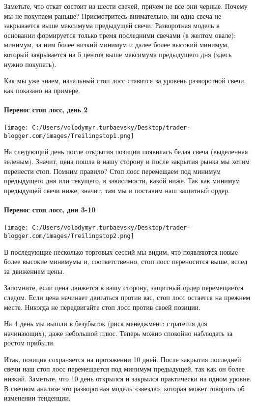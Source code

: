 \documentclass[a5paper]{article}
\begin{document}
Заметьте, что откат состоит из шести свечей, причем не все они черные. Почему мы не покупаем раньше? Присмотритесь внимательно, ни одна свеча не закрывается выше максимума предыдущей свечи. Разворотная модель в основании формируется только тремя последними свечами (в желтом овале): минимум, за ним более низкий минимум и далее более высокий минимум, который закрывается на 5 центов выше максимума предыдущего дня (здесь нужно покупать).

Как мы уже знаем, начальный стоп лосс ставится за уровень разворотной
свечи, как показано на примере.

\paragraph{Перенос стоп лосс, день 2}

\texttt{[image: C:/Users/volodymyr.turbaevsky/Desktop/trader-blogger.com/images/Treilingstop1.png]}

На следующий день после открытия позиции появилась белая свеча
(выделенная зеленым). Значит, цена пошла в нашу сторону и после
закрытия рынка мы хотим перенести стоп. Помним правило? Стоп лосс
перемещаем под минимум предыдущего дня или текущего, в зависимости,
какой ниже. Так как минимум предыдущей свечи ниже, значит, там мы и
поставим наш защитный ордер.

\paragraph{Перенос стоп лосс, дни 3-10}

\texttt{[image: C:/Users/volodymyr.turbaevsky/Desktop/trader-blogger.com/images/Treilingstop2.png]}

В последующие несколько торговых сессий мы видим, что появляются новые более высокие минимумы и, соответственно, стоп лосс переносится выше, вслед за движением цены.

Запомните, если цена движется в вашу сторону, защитный ордер перемещается следом. Если цена начинает двигаться против вас, стоп лосс остается на прежнем месте. Никогда не передвигайте стоп лосс против своей позиции.

На 4 день мы вышли в безубыток (риск менеджмент: стратегия для начинающих), даже небольшой плюс. Теперь можно спокойно наблюдать за ростом прибыли.

Итак, позиция сохраняется на протяжении 10 дней. После закрытия
последней свечи наш стоп лосс перемещается под минимум предыдущей, так
как он более низкий. Заметьте, что 10 день открылся и закрылся
практически на одном уровне. В свечном анализе это разворотная модель
«звезда», которая может говорить об изменении тенденции.
\end{document}
